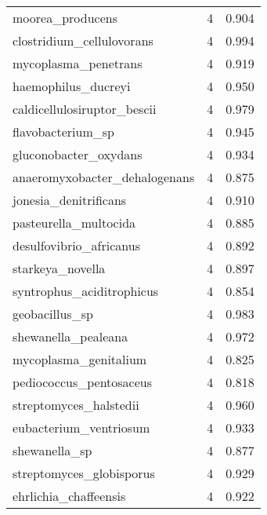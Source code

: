 \begin{tabular}{lrr}
                            moorea\_producens &                   4 &     0.904 \\
                   clostridium\_cellulovorans &                   4 &     0.994 \\
                        mycoplasma\_penetrans &                   4 &     0.919 \\
                         haemophilus\_ducreyi &                   4 &     0.950 \\
                 caldicellulosiruptor\_bescii &                   4 &     0.979 \\
                           flavobacterium\_sp &                   4 &     0.945 \\
                       gluconobacter\_oxydans &                   4 &     0.934 \\
               anaeromyxobacter\_dehalogenans &                   4 &     0.875 \\
                       jonesia\_denitrificans &                   4 &     0.910 \\
                       pasteurella\_multocida &                   4 &     0.885 \\
                     desulfovibrio\_africanus &                   4 &     0.892 \\
                            starkeya\_novella &                   4 &     0.897 \\
                   syntrophus\_aciditrophicus &                   4 &     0.854 \\
                              geobacillus\_sp &                   4 &     0.983 \\
                         shewanella\_pealeana &                   4 &     0.972 \\
                       mycoplasma\_genitalium &                   4 &     0.825 \\
                     pediococcus\_pentosaceus &                   4 &     0.818 \\
                      streptomyces\_halstedii &                   4 &     0.960 \\
                      eubacterium\_ventriosum &                   4 &     0.933 \\
                               shewanella\_sp &                   4 &     0.877 \\
                    streptomyces\_globisporus &                   4 &     0.929 \\
                       ehrlichia\_chaffeensis &                   4 &     0.922 \\

\end{tabular}
